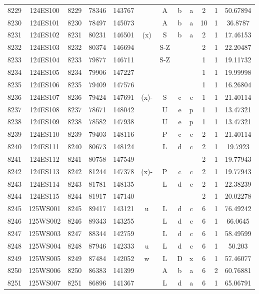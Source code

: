 \begin{tabular}{|*{12}{c|}}
8229 & 124ES100 & 8229 & 78346 & 143767 &  & A & b & a & 2 & 1 & 50.67894 \\ 
8230 & 124ES101 & 8230 & 78497 & 145073 &  & A & b & a & 10 & 1 & 36.8787 \\ 
8231 & 124ES102 & 8231 & 80231 & 146501 & (x) & S & b & a & 2 & 1 & 17.46153 \\ 
8232 & 124ES103 & 8232 & 80374 & 146694 &  & S-Z &  &  & 2 & 1 & 22.20487 \\ 
8233 & 124ES104 & 8233 & 79877 & 146711 &  & S-Z &  &  & 1 & 1 & 19.11732 \\ 
8234 & 124ES105 & 8234 & 79906 & 147227 &  &  &  &  & 1 & 1 & 19.99998 \\ 
8235 & 124ES106 & 8235 & 79409 & 147576 &  &  &  &  & 1 & 1 & 16.26804 \\ 
8236 & 124ES107 & 8236 & 79424 & 147691 & (x)- & S & c & c & 1 & 1 & 21.40114 \\ 
8237 & 124ES108 & 8237 & 78671 & 148042 &  & U & e & p & 1 & 1 & 13.47321 \\ 
8238 & 124ES109 & 8238 & 78582 & 147938 &  & U & e & p & 1 & 1 & 13.47321 \\ 
8239 & 124ES110 & 8239 & 79403 & 148116 &  & P & c & c & 2 & 1 & 21.40114 \\ 
8240 & 124ES111 & 8240 & 80673 & 148124 &  & L & d & c & 2 & 1 & 19.7923 \\ 
8241 & 124ES112 & 8241 & 80758 & 147549 &  &  &  &  & 2 & 1 & 19.77943 \\ 
8242 & 124ES113 & 8242 & 81244 & 147378 & (x)- & P & c & c & 2 & 1 & 19.77943 \\ 
8243 & 124ES114 & 8243 & 81781 & 148135 &  & L & d & c & 2 & 1 & 22.38239 \\ 
8244 & 124ES115 & 8244 & 81917 & 147140 &  &  &  &  & 2 & 1 & 20.02278 \\ 
8245 & 125WS001 & 8245 & 89417 & 143121 & u & L & d & c & 6 & 1 & 76.49242 \\ 
8246 & 125WS002 & 8246 & 89343 & 143255 &  & L & d & c & 6 & 1 & 66.0645 \\ 
8247 & 125WS003 & 8247 & 88344 & 142759 &  & L & d & c & 6 & 1 & 58.49599 \\ 
8248 & 125WS004 & 8248 & 87946 & 142333 & u & L & d & c & 6 & 1 & 50.203 \\ 
8249 & 125WS005 & 8249 & 87484 & 142052 & w & L & D & x & 6 & 1 & 57.46077 \\ 
8250 & 125WS006 & 8250 & 86383 & 141399 &  & A & b & a & 6 & 2 & 60.76881 \\ 
8251 & 125WS007 & 8251 & 86896 & 141367 &  & L & d & a & 6 & 1 & 65.06791 \\ 

\end{tabular}

